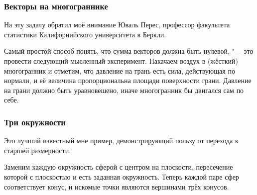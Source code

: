 \documentclass[twoside]{book}
\makeatletter
\newcommand{\rindex}[2][\imki@jobname]{%
\index[#1]{\detokenize{#2}}%
}
\makeatother
\begin{document}

\subsubsection*{Векторы на многограннике}%

На эту задачу обратил моё внимание Юваль Перес, профессор факультета статистики Калифорнийского университета в Беркли. %

\medskip

Самый простой способ понять, что сумма векторов должна быть нулевой, "--- это провести следующий мысленный эксперимент.
Накачаем воздух в (жёсткий) многогранник и отметим, что давление на грань есть сила, действующая по нормали, и её величина пропорциональна площади поверхности грани.
Давление на грани должно быть уравновешено, иначе многогранник бы двигался сам по \mbox{себе}. \null
\heart






\subsubsection*{Три окружности}%

Это лучший известный мне пример, демонстрирующий пользу от перехода к
старшей размерности.

\medskip

Заменим каждую окружность сферой с центром на плоскости, пересечение
которой с плоскостью и есть заданная окружность.
Теперь каждой паре
сфер соответствует конус, и искомые точки являются вершинами трёх
конусов.
\end{document}
